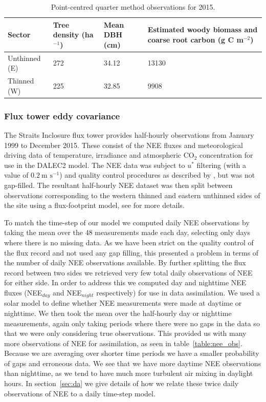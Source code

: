 \begin{table}[ht] 
	\caption{Point-centred quarter method observations for 2015.}
\begin{center}
	\begin{tabular}{| l | p{2cm} | p{2cm} | p{4.5cm} |}
	\hline
	Sector & Tree density (ha\(^{-1}\)) & Mean DBH (cm) & Estimated woody biomass and coarse root carbon (g C m\(^{-2}\)) \\ \hline
	Unthinned (E) & 272 & 34.12 & 13130 \\ \hline
	Thinned (W) & 225 & 32.85 & 9908 \\ \hline
	\end{tabular}
	\label{table:cwoo_obs}
\end{center} 
\end{table}

\subsubsection{Flux tower eddy covariance} \label{sec:eddycov} 

The Straits Inclosure flux tower provides half-hourly observations from January 1999 to December 2015. These consist of the NEE fluxes and meteorological driving data of temperature, irradiance and atmospheric CO\(_{2}\) concentration for use in the DALEC2 model. The NEE data was subject to \(u^*\) filtering (with a value of \(0.2~\text{m s}^{-1}\)) and quality control procedures as described by \citet{papale2006towards}, but was not gap-filled. The resultant half-hourly NEE dataset was then split between observations corresponding to the western thinned and eastern unthinned sides of the site using a flux-footprint model, see \citet{wilkinson2015effects} for more details.  

To match the time-step of our model we computed daily NEE observations by taking the mean over the 48 measurements made each day, selecting only days where there is no missing data. As we have been strict on the quality control of the flux record and not used any gap filling, this presented a problem in terms of the number of daily NEE observations available. By further splitting the flux record between two sides we retrieved very few total daily observations of NEE for either side. In order to address this we computed day and nighttime NEE fluxes (NEE\(_{day}\) and NEE\(_{night}\) respectively) for use in data assimilation. We used a solar model to define whether NEE measurements were made at daytime or nighttime. We then took the mean over the half-hourly day or nighttime measurements, again only taking periods where there were no gaps in the data so that we were only considering true observations. This provided us with many more observations of NEE for assimilation, as seen in table~\ref{table:nee_obs}. Because we are averaging over shorter time periods we have a smaller probability of gaps and erroneous data. We see that we have more daytime NEE observations than nighttime, as we tend to have much more turbulent air mixing in daylight hours. In section~\ref{sec:da} we give details of how we relate these twice daily observations of NEE to a daily time-step model.     

